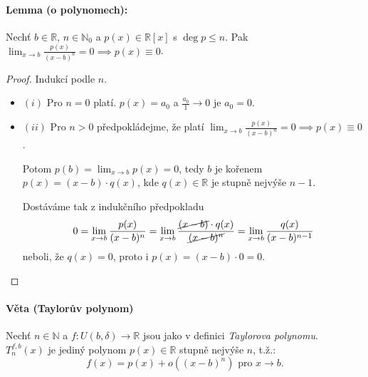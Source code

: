 \documentclass[10pt,a4paper]{article}
\newcommand{\N}{{\mathbb{N}}}
\newcommand{\R}{{\mathbb{R}}}
\renewcommand\qedsymbol{$\blacksquare$}
\begin{document}
\renewcommand\qedsymbol{$\square$}

\paragraph*{Lemma (o polynomech):} Nechť $b\in\R$, $n\in \N_0$ a $p(x)\in \R[x]$ s $\deg p \leq n$. Pak $\displaystyle \lim_{x\to b}\frac{p(x)}{(x-b)^n} = 0 \implies p(x) \equiv 0$.
\begin{proof}
    Indukcí podle $n$. 
    \begin{itemize}
        \item $(i)$ Pro $n = 0$ platí. $p(x) = a_0$ a $\frac {a_0}1 \to 0$ je $a_0 = 0$.
        \item $(ii)$ Pro $n > 0$ předpokládejme, že platí $\displaystyle \lim_{x\to b}\frac{p(x)}{(x-b)^n} = 0 \implies p(x) \equiv 0$.
    
        Potom $\displaystyle p(b) = \lim_{x\to b} p(x) = 0$, tedy $b$ je kořenem $p(x) = (x - b) \cdot q(x)$, kde $q(x) \in \R$ je stupně nejvýše $n - 1$.

        Dostáváme tak z indukčního předpokladu \[
        0 = \lim_{x\to b}\frac{p(x)}{(x-b)^n} = \lim_{x\to b}\frac{\cancel{(x-b)}\cdot q(x)}{\cancel{(x-b)^n}} = \lim_{x\to b}\frac{q(x)}{(x-b)^{n-1}}
    \] neboli, že $q(x) = 0$, proto i $p(x) = (x-b)\cdot 0 = 0$.
    \end{itemize}
     
    
\end{proof}

\renewcommand\qedsymbol{$\blacksquare$}

\paragraph*{Věta (Taylorův polynom)} Nechť $n\in \N$ a $f: U(b, \delta) \to \R$ jsou jako v definici \textit{Taylorova polynomu}. \\
$T_n^{f,b}(x)$ je jediný polynom $p(x)\in \R$ stupně nejvýše $n$, t.ž.:
\[
    f(x) = p(x) + o((x-b)^n) \text{ pro } x\to b.
\]
\end{document}
